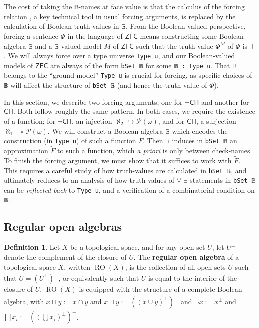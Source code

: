 \documentclass[sigplan,10pt,review]{acmart}
\newcommand{\lil}{\lstinline}
\newcommand{\ZFC}{\mathsf{ZFC}}
\newcommand{\CH}{\mathsf{CH}}
\theoremstyle{definition}
\newtheorem{defn}{Definition}[section]
\begin{document}
The cost of taking the \lstinline{𝔹}-names at face value is that the calculus of the forcing relation \cite{shoenfield1971unramified}, a key technical tool in usual forcing arguments, is replaced by the calculation of Boolean truth-values in \lstinline{𝔹}.
From the Boolean-valued perspective, forcing a sentence \(\Phi\) in the language of \(\ZFC\) means constructing some Boolean algebra \lil{𝔹} and a \lil{𝔹}-valued model \(M\) of \(\ZFC\) such that the truth value \(\Phi^{M}\) of \(\Phi\) is \(\top\).
We will always force over a type universe \lil{Type u}, and our Boolean-valued models of \(\ZFC\) are always of the form \lil{bSet 𝔹} for some \lil{𝔹 : Type u}.
That \lil{𝔹} belongs to the ``ground model'' \lil{Type u} is crucial for forcing, as specific choices of \lil{𝔹} will affect the structure of \lil{bSet 𝔹} (and hence the truth-value of \(\Phi\)). %

In this section, we describe two forcing arguments, one for \(\neg \CH\) and another for \(\CH\).
Both follow roughly the same pattern. In both cases, we require the existence of a function; for \(\neg \CH\), an injection \(\aleph_2 \hookrightarrow \mathcal{P}(\omega)\), and for \(\CH\), a surjection \(\aleph_1 \twoheadrightarrow \mathcal{P}(\omega)\).
We will construct a Boolean algebra \lil{𝔹} which encodes the construction (in \lil{Type u}) of such a function \(F\).
Then \lil{𝔹} induces in \lil{bSet 𝔹} an approximation \(\widetilde{F}\) to such a function, which \emph{a priori} is only between check-names.
To finish the forcing argument, we must show that it suffices to work with \(\widetilde{F}\).
This requires a careful study of how truth-values are calculated in \lil{bSet 𝔹},
and ultimately reduces to an analysis of how truth-values of \(\forall\)-\(\exists\) statements in \lil{bSet 𝔹} can be \emph{reflected back} to \lil{Type u}, and a verification of a combinatorial condition on \lil{𝔹}.

\subsection{Regular open algebras}
\begin{defn}\label{def:regular-open-algebra}
  Let $X$ be a topological space, and for any open set $U$, let $U^{\perp}$ denote the complement of the closure of $U$.
  The \textbf{regular open algebra} of a topological space $X$, written $\operatorname{RO}(X)$, is the collection of all open sets $U$ such that $U = (U^\perp)^\perp$, or equivalently such that
  $U$ is equal to the interior of the closure of $U$.
  $\operatorname{RO}(X)$ is equipped with the structure of a complete Boolean algebra, with $x \sqcap y := x \cap y$ and $x \sqcup y := ((x \cup y)^\perp)^\perp$ and $\neg x := x^\perp$ and $\bigsqcup x_i := ((\bigcup x_i)^\perp)^\perp$.
\end{defn}
\end{document}
